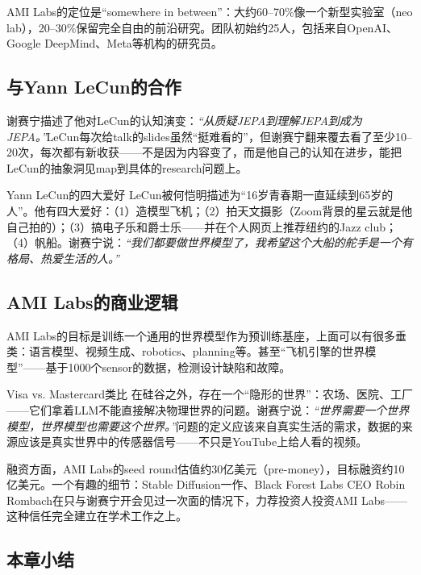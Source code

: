 \documentclass[a4paper]{article}
\begin{document}
AMI Labs的定位是``somewhere in between''：大约60--70\%像一个新型实验室（neo lab），20--30\%保留完全自由的前沿研究。团队初始约25人，包括来自OpenAI、Google DeepMind、Meta等机构的研究员。

\subsection{与Yann LeCun的合作}

谢赛宁描述了他对LeCun的认知演变：\textit{``从质疑JEPA到理解JEPA到成为JEPA。''}LeCun每次给talk的slides虽然``挺难看的''，但谢赛宁翻来覆去看了至少10--20次，每次都有新收获——不是因为内容变了，而是他自己的认知在进步，能把LeCun的抽象洞见map到具体的research问题上。

\begin{knowledgebox}{Yann LeCun的四大爱好}
LeCun被何恺明描述为``16岁青春期一直延续到65岁的人''。他有四大爱好：（1）造模型飞机；（2）拍天文摄影（Zoom背景的星云就是他自己拍的）；（3）搞电子乐和爵士乐——并在个人网页上推荐纽约的Jazz club；（4）帆船。谢赛宁说：\textit{``我们都要做世界模型了，我希望这个大船的舵手是一个有格局、热爱生活的人。''}
\end{knowledgebox}

\subsection{AMI Labs的商业逻辑}

AMI Labs的目标是训练一个通用的世界模型作为预训练基座，上面可以有很多垂类：语言模型、视频生成、robotics、planning等。甚至``飞机引擎的世界模型''——基于1000个sensor的数据，检测设计缺陷和故障。

\begin{importantbox}{Visa vs. Mastercard类比}
在硅谷之外，存在一个``隐形的世界''：农场、医院、工厂——它们拿着LLM不能直接解决物理世界的问题。谢赛宁说：\textit{``世界需要一个世界模型，世界模型也需要这个世界。''}问题的定义应该来自真实生活的需求，数据的来源应该是真实世界中的传感器信号——不只是YouTube上给人看的视频。
\end{importantbox}

融资方面，AMI Labs的seed round估值约30亿美元（pre-money），目标融资约10亿美元。一个有趣的细节：Stable Diffusion一作、Black Forest Labs CEO Robin Rombach在只与谢赛宁开会见过一次面的情况下，力荐投资人投资AMI Labs——这种信任完全建立在学术工作之上。

\subsection{本章小结}
\end{document}
